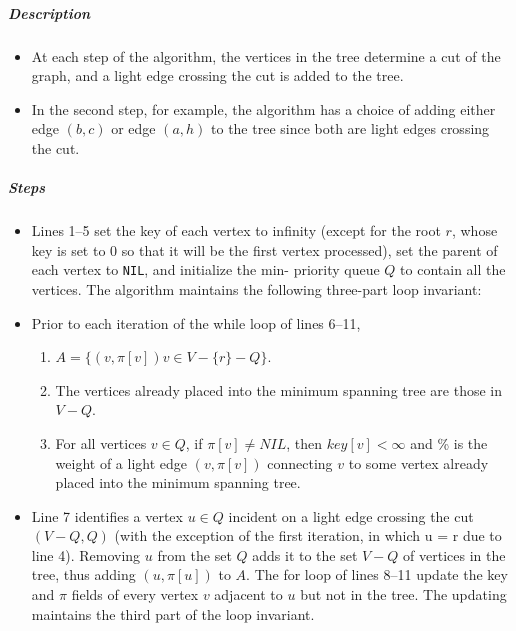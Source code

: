 \documentclass[a4paper,11pt]{article}
\begin{document}
\subparagraph{Description}\label{description-1}

\begin{itemize}
\itemsep1pt\parskip0pt
\item
  At each step of the algorithm, the vertices in the tree determine a
  cut of the graph, and a light edge crossing the cut is added to the
  tree.
\item
  In the second step, for example, the algorithm has a choice of adding
  either edge $(b, c)$ or edge $(a, h)$ to the tree since both are light
  edges crossing the cut.
\end{itemize}

\subparagraph{Steps}\label{steps-1}

\begin{itemize}
\item
  Lines 1--5 set the key of each vertex to infinity (except for the root
  $r$, whose key is set to $0$ so that it will be the first vertex
  processed), set the parent of each vertex to \texttt{NIL}, and
  initialize the min- priority queue $Q$ to contain all the vertices.
  The algorithm maintains the following three-part loop invariant:
\item
  Prior to each iteration of the while loop of lines 6--11,

  \begin{enumerate}
  \def\labelenumi{\arabic{enumi}.}
  \itemsep1pt\parskip0pt
  \item
    $A=\lbrace (v, \pi [v]) v \in V- \lbrace r\rbrace - Q \rbrace$.
  \item
    The vertices already placed into the minimum spanning tree are those
    in $V - Q$.
  \item
    For all vertices $v \in Q$, if $\pi [v] \not = NIL$, then
    $key[v] < \infty$ and \% is the weight of a light edge $(v,\pi [v])$
    connecting $v$ to some vertex already placed into the minimum
    spanning tree.
  \end{enumerate}
\item
  Line 7 identifies a vertex $u \in Q$ incident on a light edge crossing
  the cut $(V - Q, Q)$ (with the exception of the first iteration, in
  which u = r due to line 4). Removing $u$ from the set $Q$ adds it to
  the set $V - Q$ of vertices in the tree, thus adding $(u, \pi [u])$ to
  $A$. The for loop of lines 8--11 update the key and $\pi$ fields of
  every vertex $v$ adjacent to $u$ but not in the tree. The updating
  maintains the third part of the loop invariant.
\end{itemize}
\end{document}
